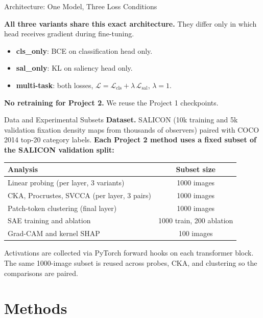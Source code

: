 \documentclass{beamer}
\begin{document}
\begin{frame}{Architecture: One Model, Three Loss Conditions}
\begin{center}
{}
\end{center}
\footnotesize
\textbf{All three variants share this exact architecture.} They differ only in which head receives gradient during fine-tuning.
\begin{itemize}\setlength\itemsep{1pt}
  \item \textcolor{clsorange}{\textbf{cls\_only}}: BCE on classification head only.
  \item \textcolor{salgreen}{\textbf{sal\_only}}: KL on saliency head only.
  \item \textcolor{mtblue}{\textbf{multi-task}}: both losses, $\mathcal{L} = \mathcal{L}_{\text{cls}} + \lambda\, \mathcal{L}_{\text{sal}}$, $\lambda=1$.
\end{itemize}
\textbf{No retraining for Project 2.} We reuse the Project 1 checkpoints.
\end{frame}

\begin{frame}{Data and Experimental Subsets}
\footnotesize
\textbf{Dataset.} SALICON (10k training and 5k validation fixation density maps from thousands of observers) paired with COCO 2014 top-20 category labels.
\vfill
\textbf{Each Project 2 method uses a fixed subset of the SALICON validation split:}
\begin{center}
\begin{tabular}{lc}
\toprule
Analysis & Subset size \\
\midrule
Linear probing (per layer, 3 variants) & 1000 images \\
CKA, Procrustes, SVCCA (per layer, 3 pairs) & 1000 images \\
Patch-token clustering (final layer) & 1000 images \\
SAE training and ablation & 1000 train, 200 ablation \\
Grad-CAM and kernel SHAP & 100 images \\
\bottomrule
\end{tabular}
\end{center}
\vfill
Activations are collected via PyTorch forward hooks on each transformer block. The same 1000-image subset is reused across probes, CKA, and clustering so the comparisons are paired.
\end{frame}

\section{Methods}
\end{document}
